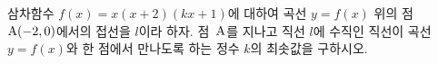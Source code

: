 삼차함수 $f(x)=x(x+2)(kx+1)$에 대하여 곡선 $y=f(x)$ 위의 점 $\mathrm{A}(-2{,}\mkern3mu\mathopen{}0)$에서의 접선을 $l$이라 하자. 점~$\mathrm{A}$를 지나고 직선 $l$에 수직인 직선이 곡선 $y=f(x)$와 한 점에서 만나도록 하는 정수 $k$의 최솟값을 구하시오. 
